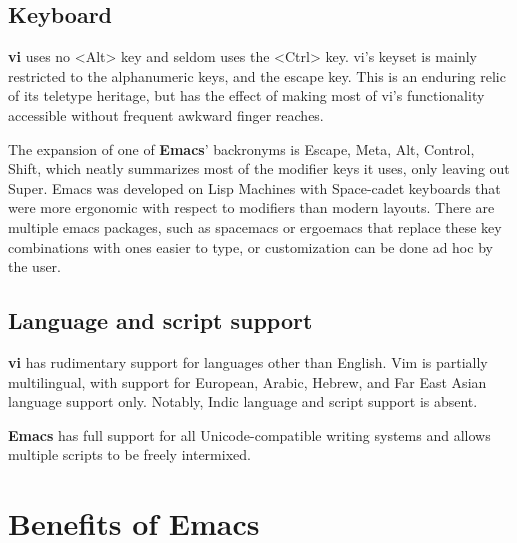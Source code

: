 \documentclass[10pt,twoside,openright]{memoir}
\begin{document}
\subsection{Keyboard}

\textbf{vi} uses no <Alt> key and seldom uses the <Ctrl> key. vi's keyset is mainly restricted to the alphanumeric keys, and the escape key. This is an enduring relic of its teletype heritage, but has the effect of making most of vi's functionality accessible without frequent awkward finger reaches.

The expansion of one of \textbf{Emacs}' backronyms is Escape, Meta, Alt, Control, Shift, which neatly summarizes most of the modifier keys it uses, only leaving out Super. Emacs was developed on Lisp Machines with Space-cadet keyboards that were more ergonomic with respect to modifiers than modern layouts. There are multiple emacs packages, such as spacemacs or ergoemacs that replace these key combinations with ones easier to type, or customization can be done ad hoc by the user.

\subsection{Language and script support}

\textbf{vi} has rudimentary support for languages other than English. Vim is partially multilingual, with support for European, Arabic, Hebrew, and Far East Asian language support only. Notably, Indic language and script support is absent.

\textbf{Emacs} has full support for all Unicode-compatible writing systems and allows multiple scripts to be freely intermixed.

\section{Benefits of Emacs}
\end{document}
